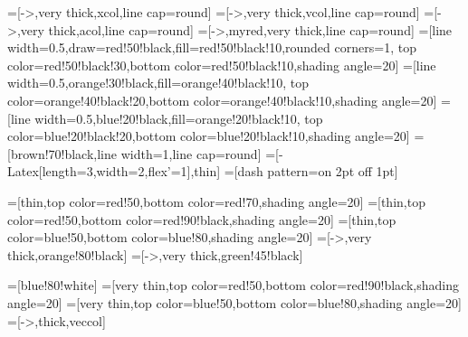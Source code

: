 =[->,very thick,xcol,line cap=round]
=[->,very thick,vcol,line cap=round]
=[->,very thick,acol,line cap=round]
=[->,myred,very thick,line cap=round]
=[line width=0.5,draw=red!50!black,fill=red!50!black!10,rounded corners=1,
                  top color=red!50!black!30,bottom color=red!50!black!10,shading angle=20]
=[line width=0.5,orange!30!black,fill=orange!40!black!10,
                  top color=orange!40!black!20,bottom color=orange!40!black!10,shading angle=20]
=[line width=0.5,blue!20!black,fill=orange!20!black!10,
                  top color=blue!20!black!20,bottom color=blue!20!black!10,shading angle=20]
=[brown!70!black,line width=1,line cap=round] %
=[-{Latex[length=3,width=2,flex'=1]},thin]
=[dash pattern=on 2pt off 1pt]
\def\rope#1{ \draw[rope,black,line width=1.4] #1; \draw[rope,line width=1.1] #1; }
\def\tick#1#2{\draw[thick] (#1) ++ (#2:0.1) --++ (#2-180:0.2)}
\newcommand\rightAnglee[4]{
  \pgfmathanglebetweenpoints{\pgfpointanchor{#2}{center}}{\pgfpointanchor{#3}{center}}
  \coordinate (tmpRA) at ($(#2)+(\pgfmathresult+45:#4)$);
  \draw[black] ($(#2)!(tmpRA)!(#1)$) -- (tmpRA) -- ($(#2)!(tmpRA)!(#3)$);
}


=[thin,top color=red!50,bottom color=red!70,shading angle=20]
=[thin,top color=red!50,bottom color=red!90!black,shading angle=20]
=[thin,top color=blue!50,bottom color=blue!80,shading angle=20]
=[->,very thick,orange!80!black]
=[->,very thick,green!45!black]

\usepackage{bm}
\usepackage{tikz,pgfplots}
\tikzset{>=latex} %
\pgfplotsset{compat=1.13}
\usetikzlibrary{decorations.markings,intersections,calc}
\usepackage[outline]{contour} %
\usetikzlibrary{angles,quotes} %
\usepackage{xcolor}
=[blue!80!white]
=[very thin,top color=red!50,bottom color=red!90!black,shading angle=20]
=[very thin,top color=blue!50,bottom color=blue!80,shading angle=20]
=[->,thick,veccol]


